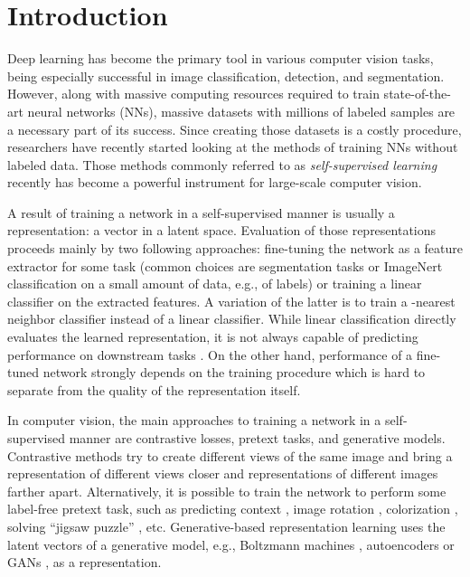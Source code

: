\documentclass[runningheads]{llncs}
\renewcommand{\cite}[1]{\citep{#1}}
\renewcommand{\emph}{\textit}
\begin{document}
\section{Introduction}
\label{sec:intro}
Deep learning has become the primary tool in various computer vision tasks, being especially successful in image classification, detection, and segmentation. However, along with massive computing resources required to train state-of-the-art neural networks (NNs), massive datasets with millions of labeled samples are a necessary part of its success. Since creating those datasets is a costly procedure, researchers have recently started looking at the methods of training NNs without labeled data. Those methods commonly referred to as \emph{self-supervised learning} recently has become a powerful instrument for large-scale computer vision. 


A result of training a network in a self-supervised manner is usually a representation: a vector in a latent space. Evaluation of those representations proceeds mainly by two following approaches: fine-tuning the network as a feature extractor for some task
(common choices are segmentation tasks or ImageNert classification on a small amount of data, e.g.,  of labels)
or training a linear classifier on the extracted features. A variation of the latter is to train a -nearest neighbor classifier instead of a linear classifier. While linear classification directly evaluates the learned representation, it is not always capable of predicting performance on downstream tasks \cite{resnick2019probing}. On the other hand, performance of a fine-tuned network strongly depends on the training procedure which is hard to separate from the quality of the representation itself.  



In computer vision, the main approaches to training a network in a self-supervised manner are contrastive losses, pretext tasks, and generative models.
Contrastive methods \cite{oord2018cpc,ye2019invariant,ermolov2020whitening} try to create different views of the same image and bring a representation of different views closer and representations of different images farther apart.
Alternatively, it is possible to train the network to perform some label-free pretext task, such as predicting  context \cite{doersch2015context}, image  rotation \cite{gidaris2018unsupervised,kolesnikov2019revisiting}, colorization \cite{zhang2016colorful}, solving ``jigsaw puzzle'' \cite{kim2018learning}, etc.
Generative-based representation learning uses the latent vectors of a generative model, e.g., Boltzmann machines \cite{lee2009convolutional}, autoencoders \cite{caron2018clustering} or GANs \cite{donahue2016bigan, donahue2019bigbigan}, as a representation. 
\end{document}
